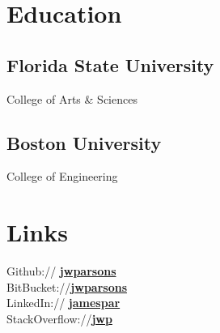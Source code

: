 \documentclass[]{deedy_resume}
\begin{document}
%
%
\lastupdated

%
%

%
%

\begin{minipage}[t]{0.36\textwidth} 


\section{Education} 
\subsection{Florida State University}
College of Arts \& Sciences\\
\sectionsep

\subsection{Boston University}
College of Engineering \\
\sectionsep


\section{Links} 
Github:// \href{https://github.com/jwparsons}{\bf jwparsons} \\
BitBucket://\href{https://bitbucket.org/jwparsons/}{\bf jwparsons} \\
LinkedIn://  \href{https://www.linkedin.com/in/jamespar/}{\bf jamespar} \\
StackOverflow://\href{https://stackoverflow.com/users/9915449/jwp}{\bf jwp}
\sectionsep


\end{minipage}
\end{document}
